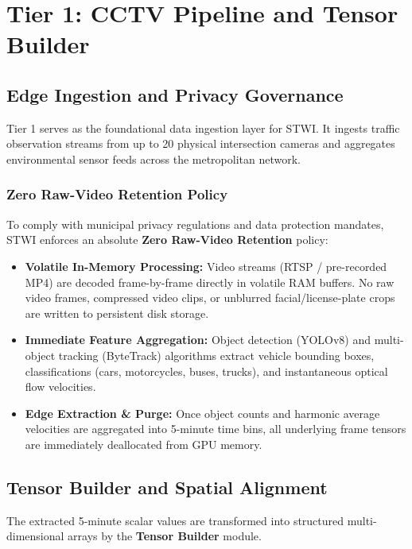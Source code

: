 \chapter{Tier 1: CCTV Pipeline and Tensor Builder}
\label{chapter:tier1}

\section{Edge Ingestion and Privacy Governance}
Tier 1 serves as the foundational data ingestion layer for STWI. It ingests traffic observation streams from up to 20 physical intersection cameras and aggregates environmental sensor feeds across the metropolitan network.

\subsection{Zero Raw-Video Retention Policy}
To comply with municipal privacy regulations and data protection mandates, STWI enforces an absolute \textbf{Zero Raw-Video Retention} policy:
\begin{itemize}[leftmargin=1.5cm, label=$\bullet$]
  \item \textbf{Volatile In-Memory Processing:} Video streams (RTSP / pre-recorded MP4) are decoded frame-by-frame directly in volatile RAM buffers. No raw video frames, compressed video clips, or unblurred facial/license-plate crops are written to persistent disk storage.
  \item \textbf{Immediate Feature Aggregation:} Object detection (YOLOv8) and multi-object tracking (ByteTrack) algorithms extract vehicle bounding boxes, classifications (cars, motorcycles, buses, trucks), and instantaneous optical flow velocities.
  \item \textbf{Edge Extraction \& Purge:} Once object counts and harmonic average velocities are aggregated into 5-minute time bins, all underlying frame tensors are immediately deallocated from GPU memory.
\end{itemize}

\section{Tensor Builder and Spatial Alignment}
The extracted 5-minute scalar values are transformed into structured multi-dimensional arrays by the \textbf{Tensor Builder} module.


